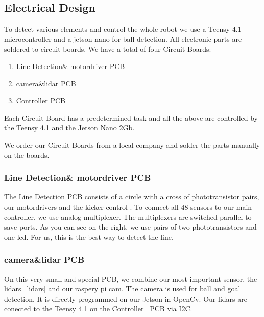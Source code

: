 \documentclass{scrartcl}
\begin{document}
\subsection{Electrical Design}
To detect various elements and control the whole robot we use a Teensy 4.1 microcontroller and a jetson nano
for ball detection. All electronic parts are soldered to circuit boards.
\newline
We have a total of four Circuit Boards:
\begin{enumerate}
    \item{Line Detection\& motordriver PCB}
    \item{camera\&lidar PCB}
    \item{Controller PCB}
\end{enumerate}
Each Circuit Board has a predetermined task and all the above are controlled by the Teensy 4.1
and the Jetson Nano 2Gb.

We order our Circuit Boards from a local company and solder the parts manually on the boards.

\subsubsection{Line Detection\& motordriver PCB}


The Line Detection PCB consists of a circle with a cross of phototransistor pairs, our motordrivers and the kicker control . To connect all
48 sensors to our main controller, we use analog multiplexer. The multiplexers are switched parallel
to save ports.
\newline
As you can see on the right, we use pairs of two phototransistors and one led. For us, this is the
best way to detect the line.

\subsubsection*{camera\&lidar PCB}
On this very small and special PCB, we combine our most important sensor, the lidars~\ref{lidars} and our raspery pi
cam. The camera is used for ball and goal detection. It is directly programmed on our Jetson in OpenCv.
Our lidars are conected to the Teensy 4.1 on the Controller~\label{PCB:Controller} PCB via I2C.
\end{document}
